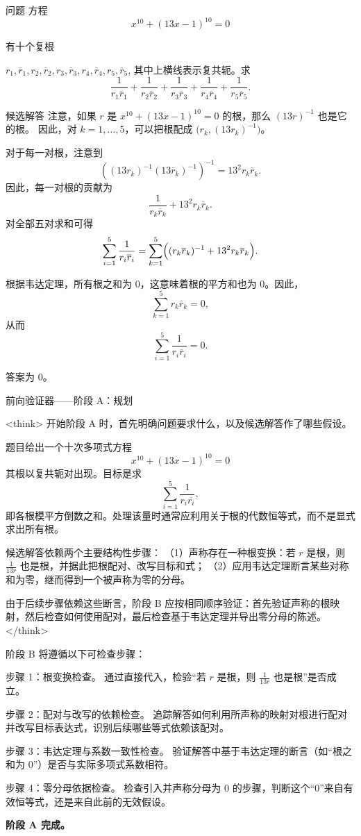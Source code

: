 \documentclass[11pt]{article}
\begin{document}
\begin{exbox}{问题}
方程
\[
x^{10} + (13x - 1)^{10} = 0
\]

有十个复根

$r_1, \overline{r}_1, r_2, \overline{r}_2, r_3, \overline{r}_3,
 r_4, \overline{r}_4, r_5, \overline{r}_5$,
其中上横线表示复共轭。求
\[
\frac{1}{r_1 \overline{r}_1}
+ \frac{1}{r_2 \overline{r}_2}
+ \frac{1}{r_3 \overline{r}_3}
+ \frac{1}{r_4 \overline{r}_4}
+ \frac{1}{r_5 \overline{r}_5}.
\]
\end{exbox}
\begin{exbox}{候选解答}
注意，如果 $r$ 是 $x^{10}+(13x-1)^{10}=0$ 的根，那么 $(13r)^{-1}$ 也是它的根。
因此，对 $k=1,\dots,5$，可以把根配成 $\bigl(r_k,(13r_k)^{-1}\bigr)$。

对于每一对根，注意到
\[
\left((13r_k)^{-1}(13\overline r_k)^{-1}\right)^{-1}
= 13^2 r_k\overline r_k .
\]
因此，每一对根的贡献为
\[
\frac{1}{r_k\overline r_k} + 13^2 r_k\overline r_k .
\]
对全部五对求和可得
\[
\sum_{i=1}^{5}\frac{1}{r_i\overline r_i}
= \sum_{k=1}^{5}\Bigl((r_k\overline r_k)^{-1} + 13^2 r_k\overline r_k\Bigr).
\]

根据韦达定理，所有根之和为 $0$，这意味着根的平方和也为 $0$。因此，
\[
\sum_{k=1}^{5} r_k\overline r_k = 0,
\]
从而
\[
\sum_{i=1}^{5}\frac{1}{r_i\overline r_i} = 0.
\]

答案为 $\boxed{0}$。
\end{exbox}

\begin{exbox}{前向验证器——阶段 A：规划}

<think>
开始阶段 A 时，首先明确问题要求什么，以及候选解答作了哪些假设。

题目给出一个十次多项式方程
\[
x^{10} + (13x - 1)^{10} = 0
\]
其根以复共轭对出现。目标是求
\[
\sum_{i=1}^{5} \frac{1}{r_i \overline{r_i}},
\]
即各根模平方倒数之和。处理该量时通常应利用关于根的代数恒等式，而不是显式求出所有根。

候选解答依赖两个主要结构性步骤：
（1）声称存在一种根变换：若 \(r\) 是根，则 \(\frac{1}{13r}\) 也是根，并据此把根配对、改写目标和式；
（2）应用韦达定理断言某些对称和为零，继而得到一个被声称为零的分母。

由于后续步骤依赖这些断言，阶段 B 应按相同顺序验证：首先验证声称的根映射，然后检查如何使用配对，最后检查基于韦达定理并导出零分母的陈述。
</think>

阶段 B 将遵循以下可检查步骤：

步骤 1：根变换检查。
    通过直接代入，检验“若 \(r\) 是根，则 \(\frac{1}{13r}\) 也是根”是否成立。

步骤 2：配对与改写的依赖检查。
    追踪解答如何利用所声称的映射对根进行配对并改写目标表达式，识别后续哪些等式依赖该配对。

步骤 3：韦达定理与系数一致性检查。
    验证解答中基于韦达定理的断言（如“根之和为 0”）是否与实际多项式系数相符。

步骤 4：零分母依据检查。
    检查引入并声称分母为 0 的步骤，判断这个“0”来自有效恒等式，还是来自此前的无效假设。

\textbf{阶段 A 完成。}

\end{exbox}
\end{document}
